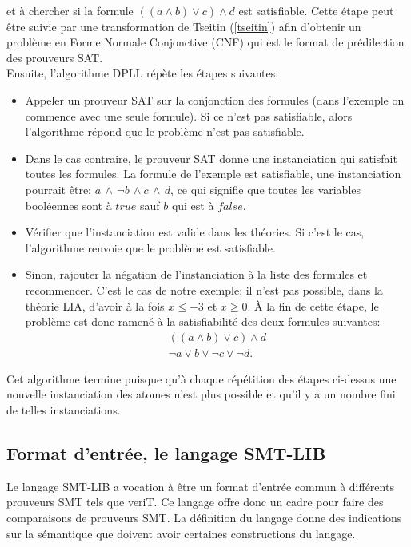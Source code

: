 \documentclass[11pt]{article}
\begin{document}
et à chercher si la formule  $((a \wedge b) \vee c) \wedge d$ est satisfiable. Cette étape peut être suivie par une transformation de Tseitin (\ref{tseitin}) afin d'obtenir un problème en Forme Normale Conjonctive (CNF) qui est le format de prédilection des prouveurs SAT. \\

Ensuite, l'algorithme DPLL répète les étapes suivantes:
\begin{itemize}
\item Appeler un prouveur SAT sur la conjonction des formules (dans l'exemple on commence avec une seule formule). Si ce n'est pas satisfiable, alors l'algorithme répond que le problème n'est pas satisfiable.
\item Dans le cas contraire, le prouveur SAT donne une instanciation qui satisfait toutes les formules. La formule de l'exemple est satisfiable, une instanciation pourrait être:
  $a \, \wedge\,\neg b \, \wedge c\, \wedge \,d$,
ce qui signifie que toutes les variables booléennes sont à $true$ sauf $b$ qui est à $false$.
\item Vérifier que l'instanciation est valide dans les théories. Si c'est le cas, l'algorithme renvoie que le problème est satisfiable.
\item Sinon, rajouter la négation de l'instanciation à la liste des formules et recommencer. C'est le cas de notre exemple: il n'est pas possible, dans la théorie LIA, d'avoir à la fois $x \leq -3$ et $x \geq 0$. À la fin de cette étape, le problème est donc ramené à la satisfiabilité des deux formules suivantes:
  \begin{align*}
    ((a \wedge b) \vee c) \wedge d \\
    \neg a \vee b \vee \neg c \vee \neg d.
  \end{align*}
\end{itemize}

Cet algorithme termine puisque qu'à chaque répétition des étapes ci-dessus une nouvelle instanciation des atomes n'est plus possible et qu'il y a un nombre fini de telles instanciations. 

\subsection{Format d'entrée, le langage SMT-LIB} \label{smt-lib}

Le langage SMT-LIB a vocation à être un format d'entrée commun à différents prouveurs SMT tels que veriT. Ce langage offre donc un cadre pour faire des comparaisons de prouveurs SMT. La définition du langage \cite{smtlib} donne des indications sur la sémantique que doivent avoir certaines constructions du langage.\\
\end{document}

